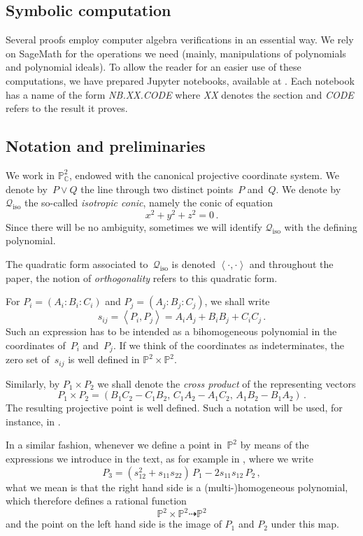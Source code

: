 \documentclass[a4paper, 11pt, reqno]{amsart}
\theoremstyle{plain}
\theoremstyle{definition}
\newcommand{\C}{\mathbb{C}}
\newcommand{\p}{\mathbb{P}}
\newcommand{\nb}[2]{\textsl{{NB}.{#1}.{#2}}}
\newcommand{\iso}{\mathcal{Q}_{\mathrm{iso}}}
\newcommand{\scl}[2]{\left\langle {#1}, {#2} \right\rangle}
\begin{document}
\subsection*{Symbolic computation}
Several proofs employ computer algebra verifications in an essential way.
We rely on SageMath \cite{SageMath} for the operations we need 
(mainly, manipulations of polynomials and polynomial ideals).
To allow the reader for an easier use of these computations, we have prepared Jupyter notebooks, available at \cite{Notebooks}.
Each notebook has a name of the form \nb{XX}{CODE} where \textit{XX} denotes the section and \textit{CODE} refers to the result it proves.

\subsection*{Notation and preliminaries}
We work in $\p^2_\C$, endowed with the canonical projective coordinate system.
We denote by~$P \vee Q$ the line through two distinct points~$P$ and~$Q$.
We denote by~$\iso$ the so-called \emph{isotropic conic}, namely the conic of equation
%
\[
 x^2 + y^2 + z^2 = 0 \,.
\]
%
Since there will be no ambiguity, sometimes we will identify $\iso$ with the 
defining polynomial.

The quadratic form associated to~$\iso$ is denoted $\left\langle \cdot, \cdot \right\rangle$ and throughout the paper, the notion of \emph{orthogonality} refers to this quadratic form.


For $P_i=(A_i:B_i:C_i)$ and $P_j=(A_j:B_j:C_j)$, we shall write
%
\[
  s_{ij} = \scl{P_i}{P_j} = A_i A_j + B_i B_j + C_i C_j \,.
\]
%
Such an expression has to be intended as a bihomogeneous polynomial in the coordinates of~$P_i$ and~$P_j$. If we think of the coordinates as indeterminates, the zero set of~$s_{ij}$ is well defined in $\p^2 \times \p^2$.

Similarly, by $P_1 \times P_2$ we shall denote the \emph{cross product} of the representing vectors
%
\begin{equation}
\label{eq:cross_product}
  P_1 \times P_2 = 
  (B_1 C_2 - C_1 B_2, \, C_1 A_2 - A_1 C_2, \, A_1 B_2 - B_1 A_2) \,.
\end{equation}
%
The resulting projective point is well defined. Such a notation will be used, for instance, in .

In a similar fashion, whenever we define a point in~$\p^2$ by means of the expressions we introduce in the text, as for example in , where we write
%
\[
  P_3 = (s_{12}^2+s_{11}s_{22}) \, P_1 - 2s_{11}s_{12} \, P_2 \,,
\]
%
what we mean is that the right hand side is a (multi-)homogeneous polynomial, which therefore defines a rational function
%
\[
  \p^2 \times \p^2 \dashrightarrow \p^2
\]
%
and the point on the left hand side is the image of $P_1$ and $P_2$ under this map.
\end{document}
